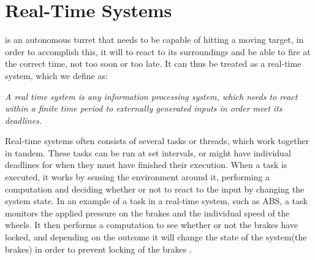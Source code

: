 \section{Real-Time Systems}\label{rts}

\name is an autonomous turret that needs to be capable of hitting a moving
target, in order to accomplish this, it will to react to its surroundings and
be able to fire at the correct time, not too soon or too late. It can thus be
treated as a real-time system, which we define as:


\begin{center}
\begin{minipage}{0.8\linewidth}
\textit{A real time system is any information processing system, which needs to
react within a finite time period to externally generated inputs in order meet
its deadlines.}
\end{minipage}
\end{center} 

Real-time systems often consists of several tasks or threads, which work
together in tandem. These tasks can be run at set intervals, or might have
individual deadlines for when they must have finished their execution. When a
task is executed, it works by sensing the environment around it, performing a
computation and deciding whether or not to react to the input by changing the
system state. In an example of a task in a real-time system, such as ABS, a task
monitors the applied pressure on the brakes and the individual speed of the
wheels. It then performs a computation to see whether or not the brakes have
locked, and depending on the outcome it will change the state of the system(the
brakes) in order to prevent locking of the brakes \citep[ch.1A]{Realtime}.


% 

